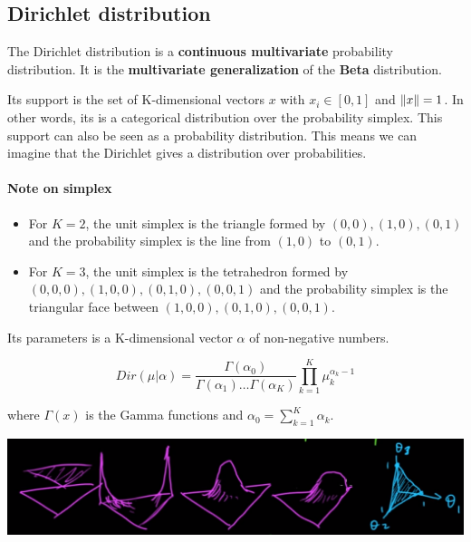 \subsection{Dirichlet distribution}

The Dirichlet distribution is a \textbf{continuous multivariate} probability distribution. It is the \textbf{multivariate generalization} of the \textbf{Beta} distribution.

Its support is the set of K-dimensional vectors $x$ with $x_i \in [0, 1]$ and $\left\lVert x\right\rVert = 1$. In other words, its is a categorical distribution over the probability simplex.
This support can also be seen as a probability distribution. This means we can imagine that the Dirichlet gives a distribution over probabilities.

\noindent\makebox[\linewidth]{\rule{\paperwidth}{0.4pt}}
\paragraph{Note on simplex}
\begin{itemize}
    \item For $K=2$, the unit simplex is the triangle formed by $(0, 0), (1, 0), (0, 1)$ and the probability simplex is the line from $(1, 0)$ to $(0, 1)$.
    \item For $K=3$, the unit simplex is the tetrahedron formed by $(0, 0, 0), (1, 0, 0), (0, 1, 0), (0, 0, 1)$ and the probability simplex is the triangular face between $(1, 0, 0), (0, 1, 0), (0, 0, 1)$.
\end{itemize}
\noindent\makebox[\linewidth]{\rule{\paperwidth}{0.4pt}}


Its parameters is a K-dimensional vector $\alpha$ of non-negative numbers.


\begin{equation}
    Dir(\mu|\alpha) = \frac{\Gamma(\alpha_0)}{\Gamma(\alpha_1) \hdots \Gamma(\alpha_K)} \prod_{k=1}^K \mu_k^{\alpha_k-1}
\end{equation}


where $\Gamma(x)$ is the Gamma functions and $\alpha_0 = \sum_{k=1}^K \alpha_k$.

\includegraphics[scale=0.25]{content/Dirichlet_distribution.png}


